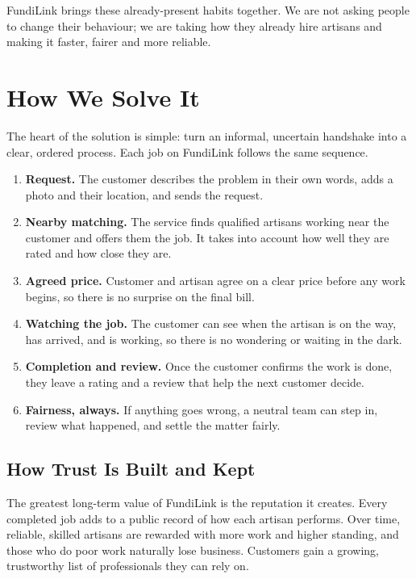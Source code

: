 \documentclass[11pt,a4paper]{article}
\begin{document}
FundiLink brings these already-present habits together. We are not asking people to change
their behaviour; we are taking how they already hire artisans and making it faster, fairer and
more reliable.

\section{How We Solve It}

The heart of the solution is simple: turn an informal, uncertain handshake into a clear,
ordered process. Each job on FundiLink follows the same sequence.

\begin{enumerate}[leftmargin=1.5em]
    \item \textbf{Request.} The customer describes the problem in their own words, adds a
          photo and their location, and sends the request.
    \item \textbf{Nearby matching.} The service finds qualified artisans working near the
          customer and offers them the job. It takes into account how well they are rated and
          how close they are.
    \item \textbf{Agreed price.} Customer and artisan agree on a clear price before any work
          begins, so there is no surprise on the final bill.
    \item \textbf{Watching the job.} The customer can see when the artisan is on the way, has
          arrived, and is working, so there is no wondering or waiting in the dark.
    \item \textbf{Completion and review.} Once the customer confirms the work is done, they
          leave a rating and a review that help the next customer decide.
    \item \textbf{Fairness, always.} If anything goes wrong, a neutral team can step in, review
          what happened, and settle the matter fairly.
\end{enumerate}

\subsection{How Trust Is Built and Kept}

The greatest long-term value of FundiLink is the reputation it creates. Every completed job
adds to a public record of how each artisan performs. Over time, reliable, skilled artisans
are rewarded with more work and higher standing, and those who do poor work naturally lose
business. Customers gain a growing, trustworthy list of professionals they can rely on.
\end{document}
